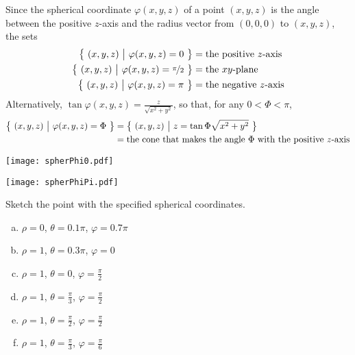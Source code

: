 \begin{solution}
Since the spherical coordinate $\varphi(x,y,z)$ of a point $(x,y,z)$ is
the angle between the positive $z$-axis and the radius vector from 
$(0,0,0)$ to $(x,y,z)$, the sets
\begin{align*}
\big\{ \ (x,y,z)\ \big|\ \varphi(x,y,z)=0\ \big\}
&=\text{the positive $z$-axis} \\
\big\{ \ (x,y,z)\ \big|\ \varphi(x,y,z)=\nicefrac{\pi}{2}\ \big\}
&=\text{the $xy$-plane} \\
\big\{ \ (x,y,z)\ \big|\ \varphi(x,y,z)=\pi\ \big\}
&=\text{the negative $z$-axis} 
\end{align*} 
Alternatively, $\tan\varphi(x,y,z)=\frac{z}{\sqrt{x^2+y^2}}$, so that,
for any $0<\Phi<\pi$,
\begin{align*}
\big\{ \ (x,y,z)\ \big|\ \varphi(x,y,z)=\Phi\ \big\}
&=\big\{ \ (x,y,z)\ \big|\ z=\tan\Phi\sqrt{x^2+y^2}\ \big\} \\
&=\text{the cone that makes the angle $\Phi$ with the positive $z$-axis} 
\end{align*} 
\begin{center}
   \texttt{[image: spherPhi0.pdf]}\qquad\quad
      \qquad\quad
\end{center}
\begin{center}
\qquad\qquad
   \texttt{[image: spherPhiPi.pdf]}
\end{center}
\end{solution}


\begin{question}
Sketch the point with the specified spherical coordinates.
\begin{enumerate}[(a)]
\item
$\rho=0$, $\theta=0.1\pi$, $\varphi=0.7\pi$
\item
$\rho=1$, $\theta=0.3\pi$, $\varphi=0$
\item
$\rho=1$, $\theta=0$, $\varphi=\frac{\pi}{2}$
\item
$\rho=1$, $\theta=\frac{\pi}{3}$, $\varphi=\frac{\pi}{2}$
\item
$\rho=1$, $\theta=\frac{\pi}{2}$, $\varphi=\frac{\pi}{2}$
\item
$\rho=1$, $\theta=\frac{\pi}{3}$, $\varphi=\frac{\pi}{6}$
\end{enumerate}

\end{question}

